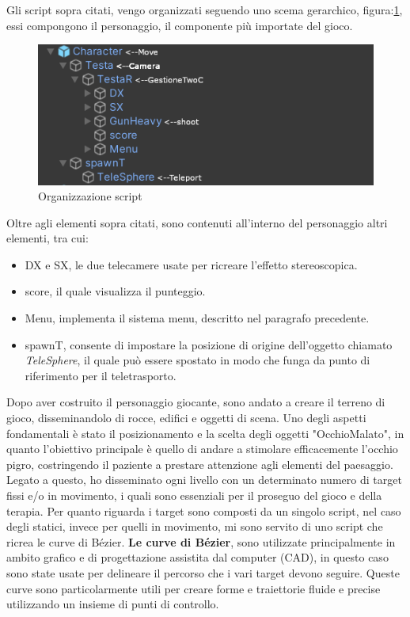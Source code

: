 \documentclass[
a4paper,
cleardoublepage=empty,
headings=twolinechapter,
numbers=autoenddot,
]{scrbook}
\begin{document}
    Gli script sopra citati, vengo organizzati seguendo uno scema gerarchico, figura:\ref{fig:script_character}, essi compongono il personaggio, il componente più importate del gioco.
    \begin{figure}[h]
    	\centering
    	\includegraphics[width=0.8\linewidth]{image/script_character}
    	\caption{Organizzazione script}
    	\label{fig:script_character}
    \end{figure}
    Oltre agli elementi sopra citati, sono contenuti all'interno del personaggio altri elementi, tra cui:
    \begin{itemize}
        \item DX e SX, le due telecamere usate per ricreare l'effetto stereoscopica.
        \item score, il quale visualizza il punteggio.
        \item Menu, implementa il sistema menu, descritto nel paragrafo precedente.
        \item spawnT, consente di impostare la posizione di origine dell'oggetto chiamato \textit{TeleSphere}, il quale può essere spostato in modo che funga da punto di riferimento per il teletrasporto.
    \end{itemize}
    Dopo aver costruito il personaggio giocante, sono andato a creare il terreno di gioco, disseminandolo di rocce, edifici e oggetti di scena.
    Uno degli aspetti fondamentali è stato il posizionamento e la scelta degli oggetti "OcchioMalato", in quanto l'obiettivo principale è quello di andare a stimolare efficacemente l'occhio pigro, costringendo il paziente a prestare attenzione agli elementi del paesaggio.
    Legato a questo, ho disseminato ogni livello con un determinato numero di target fissi e/o in movimento, i quali sono essenziali per il proseguo del gioco e della terapia.
    Per quanto riguarda i target sono composti da un singolo script, nel caso degli statici, invece per quelli in movimento, mi sono servito di uno script che ricrea le curve di Bézier\cite{Pack_asset}.
    \textbf{Le curve di Bézier}\cite{Path_asset}, sono utilizzate principalmente in ambito grafico e di progettazione assistita dal computer (CAD), in questo caso sono state usate per delineare il percorso che i vari target devono seguire. Queste curve sono particolarmente utili per creare forme e traiettorie fluide e precise utilizzando un insieme di punti di controllo.
\end{document}
